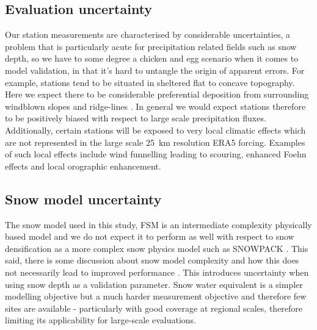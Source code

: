 \documentclass[hess, manuscript]{copernicus}
\begin{document}
\subsection{Evaluation uncertainty}
Our station measurements are characterised by considerable uncertainties, a problem that is particularly acute for precipitation related fields such as snow depth, so we have to some degree a chicken and egg scenario when it comes to model validation, in that it’s hard to untangle the origin of apparent errors. For example, stations tend to be situated in sheltered flat to concave topography. Here we expect there to be considerable preferential deposition from surrounding windblown slopes and ridge-lines \citep{Grunewald2015-qm}. In general we would expect stations therefore to be positively biased with respect to large scale precipitation fluxes. Additionally, certain stations will be exposed to very local climatic effects which are not represented in the large scale 25~km resolution ERA5 forcing. Examples of such local effects include wind funnelling leading to scouring, enhanced Foehn effects and local orographic enhancement. 


\subsection{Snow model uncertainty}
The snow model used in this study, FSM is an intermediate complexity physically based model and we do not expect it to perform as well with respect to snow densification as a more complex snow physics model such as SNOWPACK \citep{Lehning2002-ga, Wever2015-co}. This said, there is some discussion about snow model complexity and how this does not necessarily lead to improved performance \cite[c.f.][]{Magnusson2015-bi}. This introduces uncertainty when using snow depth as a validation parameter. Snow water equivalent is a simpler modelling objective but a much harder measurement objective and therefore few sites are available - particularly with good coverage at regional scales, therefore limiting its applicability for large-scale evaluations.
\end{document}
